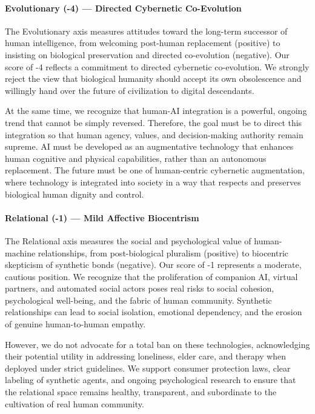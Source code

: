 \paragraph{Evolutionary (-4) --- Directed Cybernetic
Co-Evolution}\label{evolutionary--4-directed-cybernetic-co-evolution}

The Evolutionary axis measures attitudes toward the long-term successor
of human intelligence, from welcoming post-human replacement (positive)
to insisting on biological preservation and directed co-evolution
(negative). Our score of -4 reflects a commitment to directed cybernetic
co-evolution. We strongly reject the view that biological humanity
should accept its own obsolescence and willingly hand over the future of
civilization to digital descendants.

At the same time, we recognize that human-AI integration is a powerful,
ongoing trend that cannot be simply reversed. Therefore, the goal must
be to direct this integration so that human agency, values, and
decision-making authority remain supreme. AI must be developed as an
augmentative technology that enhances human cognitive and physical
capabilities, rather than an autonomous replacement. The future must be
one of human-centric cybernetic augmentation, where technology is
integrated into society in a way that respects and preserves biological
human dignity and control.

\paragraph{Relational (-1) --- Mild Affective
Biocentrism}\label{relational--1-mild-affective-biocentrism}

The Relational axis measures the social and psychological value of
human-machine relationships, from post-biological pluralism (positive)
to biocentric skepticism of synthetic bonds (negative). Our score of -1
represents a moderate, cautious position. We recognize that the
proliferation of companion AI, virtual partners, and automated social
actors poses real risks to social cohesion, psychological well-being,
and the fabric of human community. Synthetic relationships can lead to
social isolation, emotional dependency, and the erosion of genuine
human-to-human empathy.

However, we do not advocate for a total ban on these technologies,
acknowledging their potential utility in addressing loneliness, elder
care, and therapy when deployed under strict guidelines. We support
consumer protection laws, clear labeling of synthetic agents, and
ongoing psychological research to ensure that the relational space
remains healthy, transparent, and subordinate to the cultivation of real
human community.

